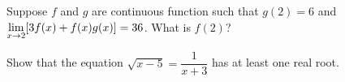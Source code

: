 \documentclass[notes]{subfiles}
\begin{document}
		\begin{ex}
			Suppose $f$ and $g$ are continuous function such that $g(2) = 6$ and $\displaystyle \lim_{x\to 2} [3f(x) + f(x)g(x)] = 36$.  What is $f(2)$?
		\end{ex}
			\newpage
			
		\begin{ex}
			Show that the equation $\sqrt{x-5} = \dfrac{1}{x+3}$ has at least one real root.
		\end{ex}
	\clearpage
\end{document}
